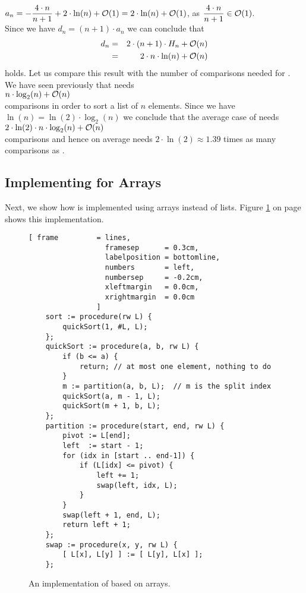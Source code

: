 $\displaystyle a_n = - \frac{4 \cdot n}{n+1}  + 2 \cdot \ln(n) + \mathcal{O}(1) =  2 \cdot \ln(n) + \mathcal{O}(1)$,
\quad as \quad $\displaystyle \frac{4 \cdot n}{n+1} \in \mathcal{O}(1)$.
\\[0.2cm]
Since we have $d_n = (n+1) \cdot a_{n}$ we can conclude that
\begin{eqnarray*}  
 d_n & = &  2 \cdot(n+1) \cdot H_n + \mathcal{O}(n) \\
     & = & 2 \cdot n \cdot \ln(n) + \mathcal{O}(n)
\end{eqnarray*}
holds.  Let us compare this result with the number of comparisons needed for .
We have seen previously that  needs
\\[0.2cm]
\hspace*{1.3cm} $n \cdot \log_2(n) + \mathcal{O}(n)$ \\[0.2cm]
comparisons in order to sort a list of $n$ elements.  Since we have $\ln(n) = \ln(2) \cdot \log_2(n)$
we conclude that the average case of  needs
 \\[0.2cm]
\hspace*{1.3cm} $2 \cdot \ln(2) \cdot n \cdot \log_2(n) + \mathcal{O}(n)$ \\[0.2cm]
comparisons and hence on average  needs  $2 \cdot \ln(2) \approx 1.39$ times as many comparisons as
.  


\subsection{Implementing  for Arrays}
Next, we show how   is implemented using arrays instead of lists.  Figure
\ref{fig:quick-sort-array.stlx} on page \pageref{fig:quick-sort-array.stlx} shows this implementation. 

\begin{figure}[!ht]
  \centering
\begin{Verbatim}[ frame         = lines, 
                  framesep      = 0.3cm, 
                  labelposition = bottomline,
                  numbers       = left,
                  numbersep     = -0.2cm,
                  xleftmargin   = 0.0cm,
                  xrightmargin  = 0.0cm
                ]
    sort := procedure(rw L) {
        quickSort(1, #L, L);
    };
    quickSort := procedure(a, b, rw L) {
        if (b <= a) {
            return; // at most one element, nothing to do
        }
        m := partition(a, b, L);  // m is the split index
        quickSort(a, m - 1, L);
        quickSort(m + 1, b, L);
    };
    partition := procedure(start, end, rw L) {
        pivot := L[end];
        left  := start - 1;
        for (idx in [start .. end-1]) {
            if (L[idx] <= pivot) {
                left += 1;
                swap(left, idx, L);
            }
        }
        swap(left + 1, end, L);
        return left + 1;
    };
    swap := procedure(x, y, rw L) {
        [ L[x], L[y] ] := [ L[y], L[x] ];
    };
\end{Verbatim}
\vspace*{-0.3cm}
  \caption{An implementation of  based on arrays.}
  \label{fig:quick-sort-array.stlx}
\end{figure}

